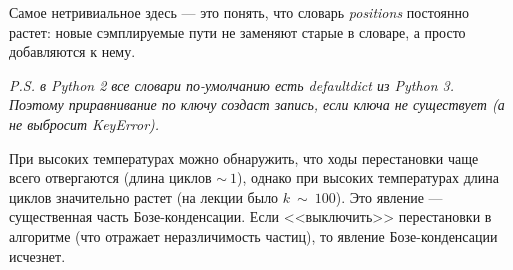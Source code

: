 \begin{lecture}
Самое нетривиальное здесь --- это понять, что словарь \textit{positions} постоянно растет: новые сэмплируемые пути не заменяют старые в словаре, а просто добавляются к нему.

\textit{P.S. в Python 2 все словари по-умолчанию есть defaultdict из Python 3. Поэтому приравнивание по ключу создаст запись, если ключа не существует (а не выбросит KeyError).}

При высоких температурах можно обнаружить, что ходы перестановки чаще всего отвергаются (длина циклов $\sim~1$), однако при высоких температурах длина циклов значительно растет (на лекции было $k~\sim~100$).
Это явление --- существенная часть Бозе-конденсации. Если <<выключить>> перестановки в алгоритме (что отражает неразличимость частиц), то явление Бозе-конденсации исчезнет.

\end{lecture}
